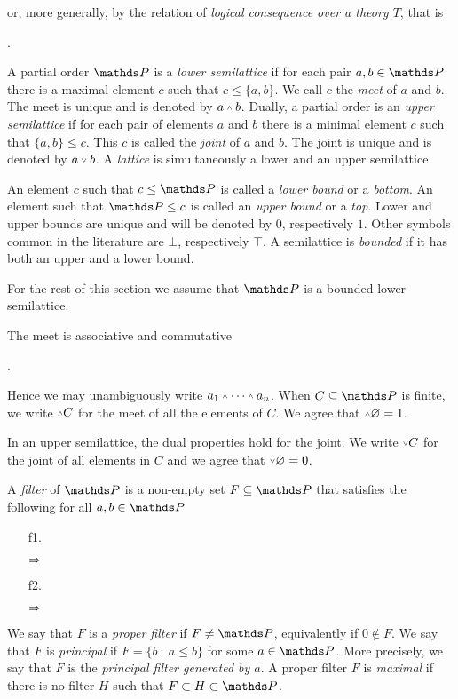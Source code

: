 \documentclass[creche.tex]{subfiles}
\begin{document}
or, more generally, by the relation of \emph{logical consequence over a theory $T$}, that is

.

A partial order $\PP$ is a \emph{lower semilattice\/} if for each pair $a,b\in\PP$ there is a maximal element $c$ such that $c\le\{a,b\}$.
We call $c$ the \emph{meet\/} of $a$ and $b$.
The meet is unique and is denoted by \emph{$a\swedge b$}.
Dually, a partial order is an \emph{upper semilattice\/} if for each pair of elements $a$ and $b$ there is a minimal element $c$ such that $\{a,b\}\le c$.
This $c$ is called the \emph{joint\/} of $a$ and $b$.
The joint is unique and is denoted by \emph{$a\svee b$}.
A \emph{lattice\/} is simultaneously a lower and an upper semilattice.

An element $c$ such that $c\le \PP$ is called a \emph{lower bound\/} or a \emph{bottom}.
An element such that $\PP\le c$ is called an \emph{upper bound\/} or a \emph{top}.
Lower and upper bounds are unique and will be denoted by \emph{$0$}, respectively \emph{$1$}.
Other symbols common in the literature are \emph{$\bot$}, respectively \emph{$\top$}.
A semilattice is \emph{bounded\/} if it has both an upper and a lower bound.

For the rest of this section we assume that $\PP$ is a bounded lower semilattice.

The meet is associative and commutative


.

Hence we may unambiguously write  $a_1\swedge\dots\swedge a_n$.
When $C\subseteq\PP$ is finite, we write \emph{$\swedge C$} for the meet of all the elements of $C$.
We agree that $\swedge\0=1$.

In an upper semilattice, the dual properties hold for the joint.
We write \emph{$\svee C$} for the joint of all elements in $C$ and we agree that  $\svee\0=0$.

A \emph{filter\/} of $\PP$ is a non-empty set $F\subseteq \PP$ that satisfies the following for all $a,b\in \PP$
\begin{itemize}
\def\ceq#1#2#3{\hspace*{16ex}\llap{$#1$}\parbox{5ex}{\hfil$#2$}\rlap{$#3$}}
\item[f1.] \ceq{a\in F\ \textrm{ and }\ a\le b}{\IMP}{b\in F}
\item[f2.] \ceq{a, b\in F}{\IMP}{a\swedge  b\in F.}
\end{itemize}
We say that $F$ is a \emph{proper filter\/} if $F\neq \PP$, equivalently if $0\notin F$.
We say that $F$ is \emph{principal\/} if $F=\big\{b\ :\ a\le b\big\}$ for some $a\in \PP$.
More precisely, we say that $F$ is the \emph{principal filter generated by $a$}.
A proper filter $F$ is \emph{maximal\/} if there is no filter $H$ such that $F\subset H\subset \PP$.
\end{document}
